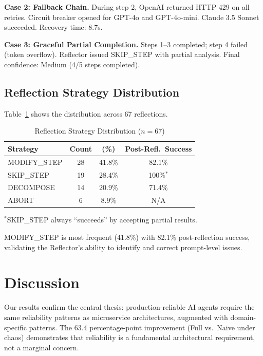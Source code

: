 \documentclass[conference]{IEEEtran}
\begin{document}
\textbf{Case 2: Fallback Chain.} During step 2, OpenAI returned HTTP 429 on all retries. Circuit breaker opened for GPT-4o and GPT-4o-mini. Claude 3.5 Sonnet succeeded. Recovery time: 8.7s.

\textbf{Case 3: Graceful Partial Completion.} Steps 1--3 completed; step 4 failed (token overflow). Reflector issued SKIP\_STEP with partial analysis. Final confidence: Medium (4/5 steps completed).

\subsection{Reflection Strategy Distribution}

Table~\ref{tab:reflection} shows the distribution across 67 reflections.

\begin{table}[htbp]
    \caption{Reflection Strategy Distribution ($n=67$)}
    \label{tab:reflection}
    \centering
    \begin{tabular}{@{}lccc@{}}
        \toprule
        \textbf{Strategy} & \textbf{Count} & \textbf{(\%)} & \textbf{Post-Refl.\ Success} \\
        \midrule
        MODIFY\_STEP & 28 & 41.8\% & 82.1\% \\
        SKIP\_STEP & 19 & 28.4\% & 100\%$^*$ \\
        DECOMPOSE & 14 & 20.9\% & 71.4\% \\
        ABORT & 6 & 8.9\% & N/A \\
        \bottomrule
    \end{tabular}
    \begin{flushleft}
        \small $^*$SKIP\_STEP always ``succeeds'' by accepting partial results.
    \end{flushleft}
\end{table}

MODIFY\_STEP is most frequent (41.8\%) with 82.1\% post-reflection success, validating the Reflector's ability to identify and correct prompt-level issues.

\section{Discussion}

Our results confirm the central thesis: production-reliable AI agents require the same reliability patterns as microservice architectures, augmented with domain-specific patterns. The 63.4 percentage-point improvement (Full vs.\ Naive under chaos) demonstrates that reliability is a fundamental architectural requirement, not a marginal concern.
\end{document}
